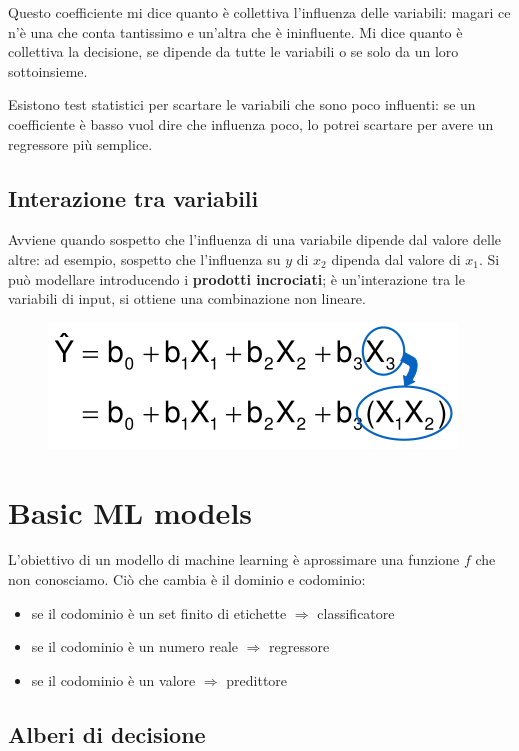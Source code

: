 \documentclass{report}
\begin{document}
\noindent Questo coefficiente mi dice quanto è collettiva l'influenza delle variabili: magari ce n'è una che conta tantissimo e un'altra che 
è ininfluente. Mi dice quanto è collettiva la decisione, se dipende da tutte le variabili o se solo da un loro sottoinsieme.

\noindent Esistono test statistici per scartare le variabili che sono poco influenti: se un coefficiente è basso vuol dire che influenza 
poco, lo potrei scartare per avere un regressore più semplice.


\subsection{Interazione tra variabili}
Avviene quando sospetto che l'influenza di una variabile dipende dal valore delle altre: ad esempio, sospetto che l'influenza su $y$
di $x_2$ dipenda dal valore di $x_1$. Si può modellare introducendo i 
\textbf{prodotti incrociati}; è un'interazione tra le variabili di input, si ottiene una combinazione non lineare.

\begin{figure}[H]
    \centering
    \includegraphics[width=0.6\linewidth]{images/prodotti-incrociati.png}
\end{figure}


\section{Basic ML models}

L'obiettivo di un modello di machine learning è aprossimare una funzione $f$ che non conosciamo. Ciò che cambia è il dominio e codominio:
\begin{itemize}
    \item se il codominio è un set finito di etichette $\Rightarrow$ classificatore 
    \item se il codominio è un numero reale $\Rightarrow$ regressore 
    \item se il codominio è un valore $\Rightarrow$ predittore 
\end{itemize}


\subsection{Alberi di decisione}
\end{document}
